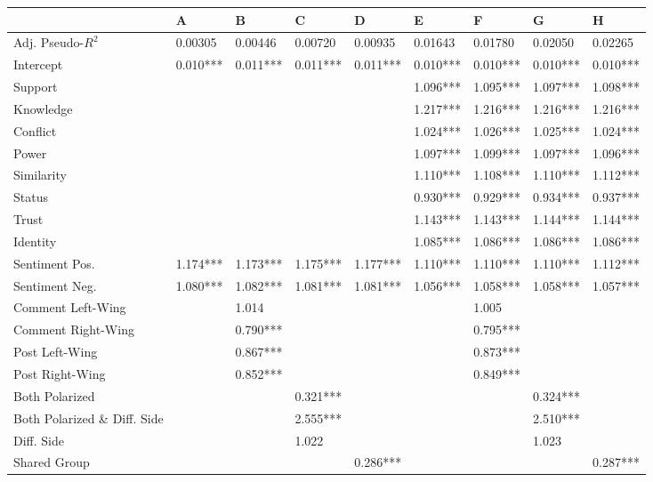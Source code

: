 \begin{tabular}{lllllllll}
\toprule
 & A & B & C & D & E & F & G & H \\
\midrule
Adj. Pseudo-$R^2$ & 0.00305 & 0.00446 & 0.00720 & 0.00935 & 0.01643 & 0.01780 & 0.02050 & 0.02265 \\ \midrule \midrule
Intercept & 0.010*** & 0.011*** & 0.011*** & 0.011*** & 0.010*** & 0.010*** & 0.010*** & 0.010*** \\ \addlinespace
Support & \dotfill & \dotfill & \dotfill & \dotfill & 1.096*** & 1.095*** & 1.097*** & 1.098*** \\
Knowledge & \dotfill & \dotfill & \dotfill & \dotfill & 1.217*** & 1.216*** & 1.216*** & 1.216*** \\
Conflict & \dotfill & \dotfill & \dotfill & \dotfill & 1.024*** & 1.026*** & 1.025*** & 1.024*** \\
Power & \dotfill & \dotfill & \dotfill & \dotfill & 1.097*** & 1.099*** & 1.097*** & 1.096*** \\
Similarity & \dotfill & \dotfill & \dotfill & \dotfill & 1.110*** & 1.108*** & 1.110*** & 1.112*** \\
Status & \dotfill & \dotfill & \dotfill & \dotfill & 0.930*** & 0.929*** & 0.934*** & 0.937*** \\
Trust & \dotfill & \dotfill & \dotfill & \dotfill & 1.143*** & 1.143*** & 1.144*** & 1.144*** \\
Identity & \dotfill & \dotfill & \dotfill & \dotfill & 1.085*** & 1.086*** & 1.086*** & 1.086*** \\ \addlinespace
Sentiment Pos. & 1.174*** & 1.173*** & 1.175*** & 1.177*** & 1.110*** & 1.110*** & 1.110*** & 1.112*** \\
Sentiment Neg. & 1.080*** & 1.082*** & 1.081*** & 1.081*** & 1.056*** & 1.058*** & 1.058*** & 1.057*** \\ \addlinespace
Comment Left-Wing & \dotfill & 1.014 & \dotfill & \dotfill & \dotfill & 1.005 & \dotfill & \dotfill \\
Comment Right-Wing & \dotfill & 0.790*** & \dotfill & \dotfill & \dotfill & 0.795*** & \dotfill & \dotfill \\
Post Left-Wing & \dotfill & 0.867*** & \dotfill & \dotfill & \dotfill & 0.873*** & \dotfill & \dotfill \\
Post Right-Wing & \dotfill & 0.852*** & \dotfill & \dotfill & \dotfill & 0.849*** & \dotfill & \dotfill \\ \addlinespace
Both Polarized & \dotfill & \dotfill & 0.321*** & \dotfill & \dotfill & \dotfill & 0.324*** & \dotfill \\
Both Polarized \& Diff. Side & \dotfill & \dotfill & 2.555*** & \dotfill & \dotfill & \dotfill & 2.510*** & \dotfill \\
Diff. Side & \dotfill & \dotfill & 1.022 & \dotfill & \dotfill & \dotfill & 1.023 & \dotfill \\
Shared Group & \dotfill & \dotfill & \dotfill & 0.286*** & \dotfill & \dotfill & \dotfill & 0.287*** \\
\bottomrule
\end{tabular}
